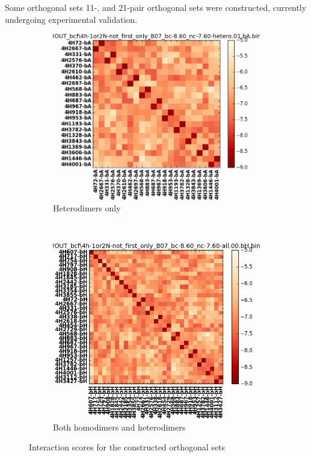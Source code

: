 \documentclass{beamer}
\theoremstyle{plain}
\theoremstyle{remark}
\begin{document}
\begin{frame}{Some orthogonal sets}
	11-, and 21-pair orthogonal sets were constructed, currently undergoing experimental validation.
	\begin{figure}
		\centering
		\begin{subfigure}{0.45\textwidth}
			\includegraphics[width=\linewidth]{figures/hetero_scores}
			\caption{Heterodimers only}
		\end{subfigure}
		~
		\begin{subfigure}{0.45\textwidth}
			\includegraphics[width=\linewidth]{figures/hetero_+_homo_scores}
			\caption{Both homodimers and heterodimers}
		\end{subfigure}
	\caption{Interaction scores for the constructed orthogonal sets}
	\end{figure}
\end{frame}
\end{document}
